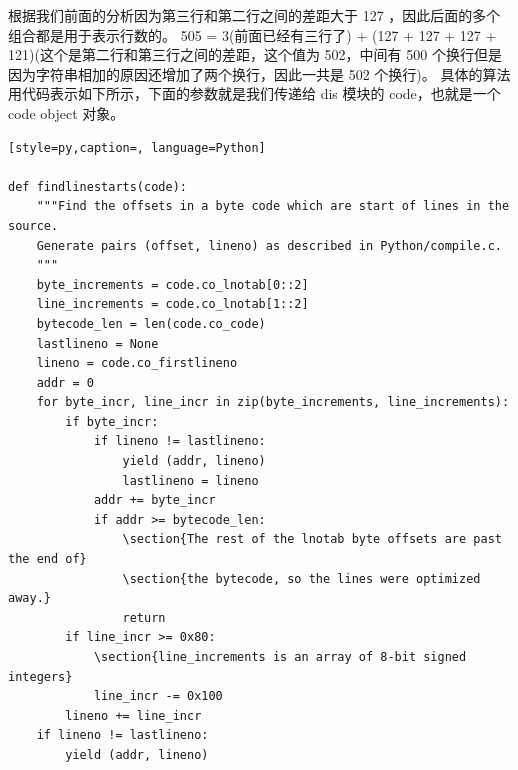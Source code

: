 根据我们前面的分析因为第三行和第二行之间的差距大于 127 ，因此后面的多个组合都是用于表示行数的。
505 = 3(前面已经有三行了) + (127 + 127 + 127 + 121)(这个是第二行和第三行之间的差距，这个值为 502，中间有 500 个换行但是因为字符串相加的原因还增加了两个换行，因此一共是 502 个换行)。
具体的算法用代码表示如下所示，下面的参数就是我们传递给 dis 模块的 code，也就是一个 code object 对象。
\begin{lstlisting}[style=py,caption=, language=Python]

def findlinestarts(code):
    """Find the offsets in a byte code which are start of lines in the source.
    Generate pairs (offset, lineno) as described in Python/compile.c.
    """
    byte_increments = code.co_lnotab[0::2]
    line_increments = code.co_lnotab[1::2]
    bytecode_len = len(code.co_code)
    lastlineno = None
    lineno = code.co_firstlineno
    addr = 0
    for byte_incr, line_incr in zip(byte_increments, line_increments):
        if byte_incr:
            if lineno != lastlineno:
                yield (addr, lineno)
                lastlineno = lineno
            addr += byte_incr
            if addr >= bytecode_len:
                \section{The rest of the lnotab byte offsets are past the end of}
                \section{the bytecode, so the lines were optimized away.}
                return
        if line_incr >= 0x80:
            \section{line_increments is an array of 8-bit signed integers}
            line_incr -= 0x100
        lineno += line_incr
    if lineno != lastlineno:
        yield (addr, lineno)
\end{lstlisting}
